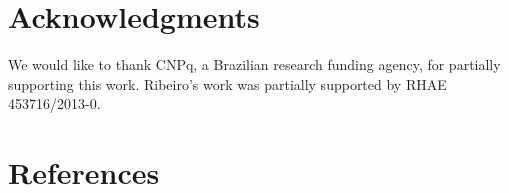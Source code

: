\documentclass[review]{elsarticle}
\begin{document}








\section{Acknowledgments}

We would like to thank CNPq, a Brazilian research funding agency, for partially supporting this work. Ribeiro's work was partially supported by RHAE 453716/2013-0.

\section{References}


\end{document}
